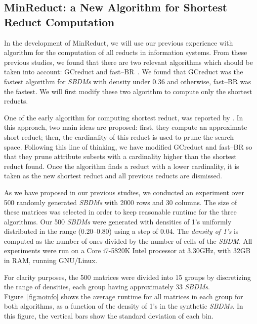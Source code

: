\documentclass[authoryear,11pt]{elsarticle}
\begin{document}
\subsection{MinReduct: a New Algorithm for Shortest Reduct Computation}\label{evaluation}
  
  In the development of MinReduct, we will use our previous experience with algorithm for the computation of all reducts in information systems. From these previous studies, we found that there are two  relevant algorithms which should be taken into account: GCreduct and fast--BR~\citep{Lias13}. We found that GCreduct was the fastest algorithm for \textit{SBDMs} with density under 0.36 and otherwise, fast--BR was the fastest. We will first modify these two algorithm to compute only the shortest reducts.
  
  One of the early algorithm for computing shortest reduct, was reported by \cite{Lin04}. In this approach, two main ideas are proposed: first, they compute an approximate short reduct; then, the cardinality of this reduct is used to prune the search space. Following this line of thinking, we have modified GCreduct and fast--BR so that they prune attribute subsets with a cardinality higher than the shortest reduct found. Once the algorithm finds a reduct with a lower cardinality, it is taken as the new shortest reduct and all previous reducts are dismissed.

  As we have proposed in our previous studies, we conducted an experiment over 500 randomly generated \textit{SBDMs} with 2000 rows and 30 columns. The size of these matrices was selected in order to keep reasonable runtime for the three algorithms. Our 500 \textit{SBDMs} were generated with densities of 1's uniformly distributed in the range (0.20--0.80) using a step of 0.04. The \emph{density of 1's} is computed as the number of ones divided by the number of cells of the \textit{SBDM}. All experiments were run on a Core i7-5820K Intel processor at 3.30GHz, with 32GB in RAM, running GNU/Linux.
  
  For clarity purposes, the 500 matrices were divided into 15 groups by discretizing the range of densities, each group having approximately 33 \textit{SBDMs}. Figure~\ref{fig:noinfo} shows the average runtime for all  matrices in each group for both algorithms, as a function of the density of 1's in the synthetic \textit{SBDMs}. In this figure, the vertical bars show the standard deviation of each bin.
  
\end{document}
